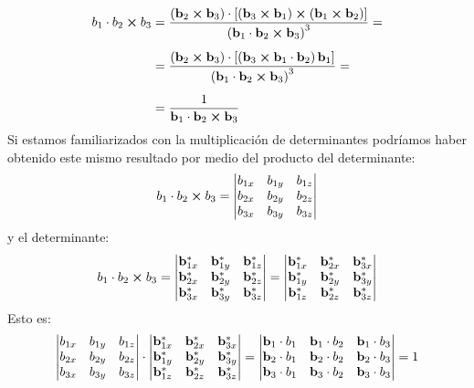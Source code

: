 \documentclass[12pt]{article}
\begin{document}
\begin{align}
\begin{aligned}
b_{1} \cdot b_{2} \cp b_{3} &= \dfrac{\left( \vb{b}_{2} \cp \vb{b}_{3} \right) \cdot \left[ \left( \vb{b}_{3} \cp \vb{b}_{1} \right) \cp \left( \vb{b}_{1} \cp \vb{b}_{2} \right) \right]}{\left( \vb{b}_{1} \cdot \vb{b}_{2} \cp \vb{b}_{3} \right)^{3}} = \\[0.5em]
 &= \dfrac{\left( \vb{b}_{2} \cp \vb{b}_{3} \right) \cdot \left[ \left( \vb{b}_{3} \cp \vb{b}_{1} \cdot \vb{b}_{2} \right) \vb{b}_{1} \right]}{\left( \vb{b}_{1} \cdot \vb{b}_{2} \cp \vb{b}_{3} \right)^{3}} = \\[0.5em]
&= \dfrac{1}{\vb{b}_{1} \cdot \vb{b}_{2} \cp \vb{b}_{3}}
\end{aligned}
\label{eq:ecuacion_01_41}
\end{align}
Si estamos familiarizados con la multiplicación de determinantes podríamos haber obtenido este mismo resultado por medio del producto del determinante:
\begin{align*}
b_{1} \cdot b_{2} \cp b_{3} = \mdet{
    b_{1x} & b_{1y} & b_{1z} \\
    b_{2x} & b_{2y} & b_{2z} \\
    b_{3x} & b_{3y} & b_{3z}}
\end{align*}
y el determinante:
\begin{align*}
b_{1} \cdot b_{2} \cp b_{3} =
    \mdet{
    \vb{b}_{1x}^{*} & \vb{b}_{1y}^{*} & \vb{b}_{1z}^{*} \\
    \vb{b}_{2x}^{*} & \vb{b}_{2y}^{*} & \vb{b}_{2z}^{*} \\
    \vb{b}_{3x}^{*} & \vb{b}_{3y}^{*} & \vb{b}_{3z}^{*}
    } = 
    \mdet{
        \vb{b}_{1x}^{*} & \vb{b}_{2x}^{*} & \vb{b}_{3x}^{*} \\
        \vb{b}_{1y}^{*} & \vb{b}_{2y}^{*} & \vb{b}_{3y}^{*} \\
        \vb{b}_{1z}^{*} & \vb{b}_{2z}^{*} & \vb{b}_{3z}^{*}
    }
\end{align*}
Esto es:
\begin{align*}
    \mdet{
        b_{1x} & b_{1y} & b_{1z} \\
        b_{2x} & b_{2y} & b_{2z} \\
        b_{3x} & b_{3y} & b_{3z}
    } \cdot
    \mdet{
        \vb{b}_{1x}^{*} & \vb{b}_{2x}^{*} & \vb{b}_{3x}^{*} \\
        \vb{b}_{1y}^{*} & \vb{b}_{2y}^{*} & \vb{b}_{3y}^{*} \\
        \vb{b}_{1z}^{*} & \vb{b}_{2z}^{*} & \vb{b}_{3z}^{*}
    } = \mdet{
        \vb{b}_{1} \cdot b_{1} & \vb{b}_{1} \cdot b_{2} & \vb{b}_{1} \cdot b_{3} \\
        \vb{b}_{2} \cdot b_{1} & \vb{b}_{2} \cdot b_{2} & \vb{b}_{2} \cdot b_{3} \\
        \vb{b}_{3} \cdot b_{1} & \vb{b}_{3} \cdot b_{2} & \vb{b}_{3} \cdot b_{3}
    } = 1
\end{align*}
\end{document}
